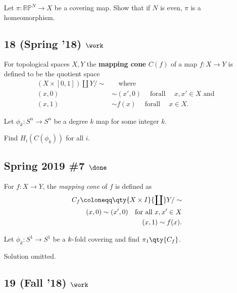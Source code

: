 Let \(\pi :{\mathbb{RP}}^N \to X\) be a covering map. Show that if \(N\)
is even, \(\pi\) is a homeomorphism.

\hypertarget{spring-18-work-1}{%
\subsection{\texorpdfstring{18 (Spring '18)
\(\work\)}{18 (Spring '18) \textbackslash work}}\label{spring-18-work-1}}

For topological spaces \(X, Y\) the \textbf{mapping cone} \(C(f )\) of a
map \(f : X \to Y\) is defined to be the quotient space
\begin{align*}  
(X \times [0, 1]){\coprod}Y / \sim &{\quad \operatorname{where} \quad}  \\ 
(x, 0) &\sim (x', 0) {\quad \operatorname{for all} \quad} x, x' \in X \text{ and } \\ 
(x, 1) &\sim f (x) {\quad \operatorname{for all } \quad} x \in X
.\end{align*}

Let \(\phi_k : S^n \to S^n\) be a degree \(k\) map for some integer
\(k\).

Find \(H_i(C(\phi_k ))\) for all \(i\).

\hypertarget{spring-2019-7-done}{%
\subsection{\texorpdfstring{Spring 2019 \#7
\(\done\)}{Spring 2019 \#7 \textbackslash done}}\label{spring-2019-7-done}}

For \(f:X\to Y\), the \emph{mapping cone} of \(f\) is defined as
\begin{align*}  
C_f \coloneqq\qty{X\times I} {\coprod}Y/\sim \\
(x, 0) \sim (x', 0) \quad \text{for all }x, x'\in X\\
(x, 1) \sim f(x)
.\end{align*}

Let \(\phi_k: S^1\to S^1\) be a \(k{\hbox{-}}\)fold covering and find
\(\pi_1\qty{C_f}\).


Solution omitted.

\hypertarget{fall-18-work-3}{%
\subsection{\texorpdfstring{19 (Fall '18)
\(\work\)}{19 (Fall '18) \textbackslash work}}\label{fall-18-work-3}}

